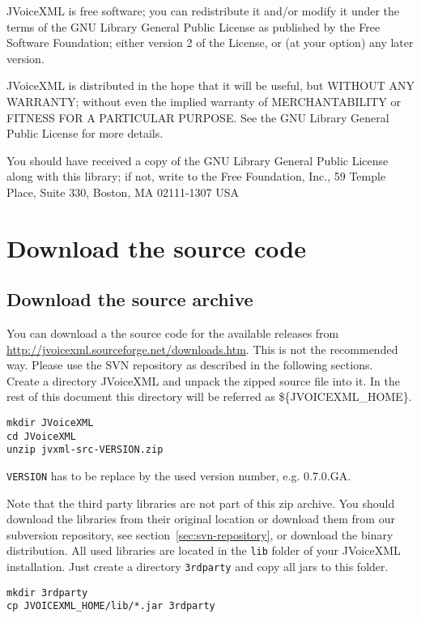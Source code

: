 \documentclass[11pt,a4paper]{article}
\begin{document}
JVoiceXML is free software; you can redistribute it and/or
modify it under the terms of the GNU Library General Public
License as published by the Free Software Foundation; either
version 2 of the License, or (at your option) any later version.

JVoiceXML is distributed in the hope that it will be useful,
but WITHOUT ANY WARRANTY; without even the implied warranty of
MERCHANTABILITY or FITNESS FOR A PARTICULAR PURPOSE. See the GNU
Library General Public License for more details.

You should have received a copy of the GNU Library General Public
License along with this library; if not, write to the Free
Foundation, Inc., 59 Temple Place, Suite 330, Boston, MA  02111-1307  USA

\section{Download the source code}

\subsection{Download the source archive}

You can download a the source code for the available releases from 
\url{http://jvoicexml.sourceforge.net/downloads.htm}.
This is not the recommended way. Please use the SVN repository as described in
the following sections. \\
Create a directory JVoice\-XML and unpack the zipped
source file into it. In the rest of this document this directory will be referred as
\$\{JVOICE\-XML\_HOME\}.

\begin{lstlisting}
mkdir JVoiceXML
cd JVoiceXML
unzip jvxml-src-VERSION.zip
\end{lstlisting}

\texttt{VERSION} has to be replace by the used version number, e.g. 0.7.0.GA.

Note that the third party libraries are not part of this zip archive.
You should download the libraries from their original location or
download them from our subversion repository, see 
section~\ref{sec:svn-repository}, or download the binary distribution.
All used libraries are located in the \texttt{lib} folder of
your JVoiceXML installation. Just create a directory 
\texttt{3rdparty} and copy all jars to this folder.

\begin{lstlisting}
mkdir 3rdparty
cp JVOICEXML_HOME/lib/*.jar 3rdparty
\end{lstlisting}
\end{document}
